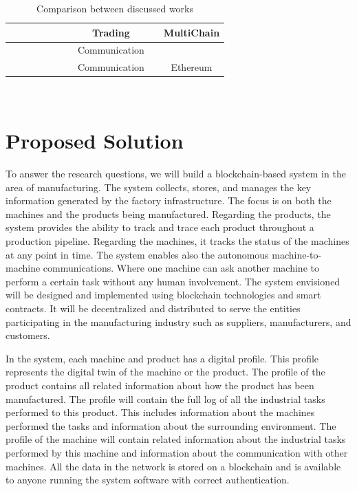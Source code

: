 \documentclass[runningheads]{llncs}
\newcommand{\cmark}{\ding{51}}%
\newcommand{\xmark}{\ding{55}}%
\begin{document}
\begin{table}[]
{\begin{tabular}{|c|c|c|c|c|c|c|c|c|c|}
\textbf{\cite{Sikorski2017}} & \cmark & \xmark & \cmark & \xmark & \xmark & \xmark & Trading & \cmark & MultiChain \\ \hline
\textbf{\cite{Afanasev2018}} & \cmark & \xmark & \cmark & \xmark & \xmark & \xmark & Communication & \xmark & \xmark \\ \hline
\textbf{\cite{Garrocho2019}} & \cmark & \xmark & \cmark & \cmark & \cmark & \xmark & Communication & \cmark & Ethereum \\ \hline
\end{tabular}%
}
\\[10pt]
\caption{Comparison between discussed works }
\label{tab1}
\end{table}


\newpage

\section{Proposed Solution}
To answer the research questions, we will build a blockchain-based system in the area of manufacturing. The system collects, stores, and manages the key information generated by the factory infrastructure. The focus is on both the machines and the products being manufactured. Regarding the products, the system provides the ability to track and trace each product throughout a production pipeline. Regarding the machines, it tracks the status of the machines at any point in time. The system enables also the autonomous machine-to-machine communications. Where one machine can ask another machine to perform a certain task without any human involvement. The system envisioned will be designed and implemented using blockchain technologies and smart contracts. It will be decentralized and distributed to serve the entities participating in the manufacturing industry such as suppliers, manufacturers, and customers. 

\bigbreak 

\noindent In the system, each machine and product has a digital profile. This profile represents the digital twin of the machine or the product.  The profile of the product contains all related information about how the product has been manufactured. The profile will contain the full log of all the industrial tasks performed to this product. This includes information about the machines performed the tasks and information about the surrounding environment. The profile of the machine will contain related information about the industrial tasks performed by this machine and information about the communication with other machines. All the data in the network is stored on a blockchain and is available to anyone running the system software with correct authentication.
\bigbreak
\end{document}
